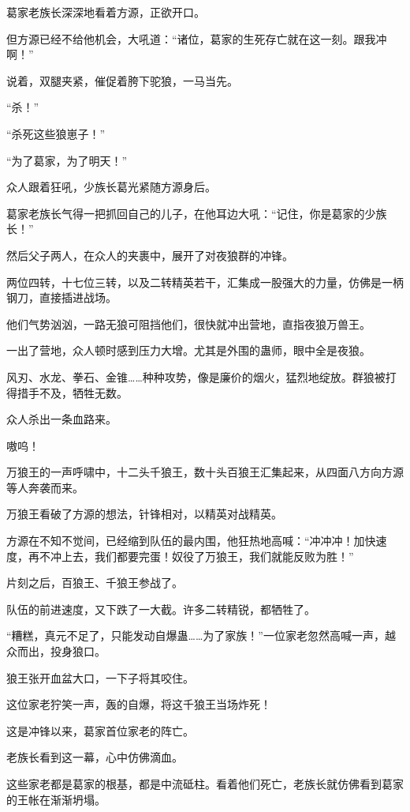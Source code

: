 \begin{this_body}
葛家老族长深深地看着方源，正欲开口。

但方源已经不给他机会，大吼道：“诸位，葛家的生死存亡就在这一刻。跟我冲啊！”

说着，双腿夹紧，催促着胯下驼狼，一马当先。

“杀！”

“杀死这些狼崽子！”

“为了葛家，为了明天！”

众人跟着狂吼，少族长葛光紧随方源身后。

葛家老族长气得一把抓回自己的儿子，在他耳边大吼：“记住，你是葛家的少族长！”

然后父子两人，在众人的夹裹中，展开了对夜狼群的冲锋。

两位四转，十七位三转，以及二转精英若干，汇集成一股强大的力量，仿佛是一柄钢刀，直接插进战场。

他们气势汹汹，一路无狼可阻挡他们，很快就冲出营地，直指夜狼万兽王。

一出了营地，众人顿时感到压力大增。尤其是外围的蛊师，眼中全是夜狼。

风刃、水龙、拳石、金锥……种种攻势，像是廉价的烟火，猛烈地绽放。群狼被打得措手不及，牺牲无数。

众人杀出一条血路来。

嗷呜！

万狼王的一声呼啸中，十二头千狼王，数十头百狼王汇集起来，从四面八方向方源等人奔袭而来。

万狼王看破了方源的想法，针锋相对，以精英对战精英。

方源在不知不觉间，已经缩到队伍的最内围，他狂热地高喊：“冲冲冲！加快速度，再不冲上去，我们都要完蛋！奴役了万狼王，我们就能反败为胜！”

片刻之后，百狼王、千狼王参战了。

队伍的前进速度，又下跌了一大截。许多二转精锐，都牺牲了。

“糟糕，真元不足了，只能发动自爆蛊……为了家族！”一位家老忽然高喊一声，越众而出，投身狼口。

狼王张开血盆大口，一下子将其咬住。

这位家老狞笑一声，轰的自爆，将这千狼王当场炸死！

这是冲锋以来，葛家首位家老的阵亡。

老族长看到这一幕，心中仿佛滴血。

这些家老都是葛家的根基，都是中流砥柱。看着他们死亡，老族长就仿佛看到葛家的王帐在渐渐坍塌。

\end{this_body}

